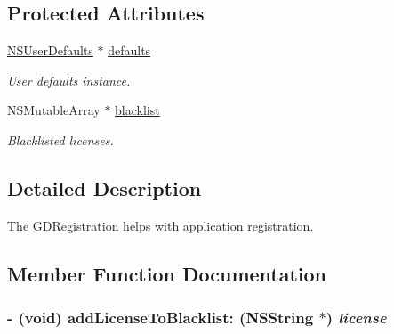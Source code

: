 \subsection*{Protected Attributes}
\begin{DoxyCompactItemize}
\item 
\hypertarget{interface_g_d_registration_a951a74df6032c61bdc6215df98dfc10f}{
\hyperlink{class_n_s_user_defaults}{NSUserDefaults} $\ast$ \hyperlink{interface_g_d_registration_a951a74df6032c61bdc6215df98dfc10f}{defaults}}
\label{interface_g_d_registration_a951a74df6032c61bdc6215df98dfc10f}

\begin{DoxyCompactList}\small\item\em User defaults instance. \item\end{DoxyCompactList}\item 
\hypertarget{interface_g_d_registration_a2cec9ccef516bf4ecbf55de00bf0dbda}{
NSMutableArray $\ast$ \hyperlink{interface_g_d_registration_a2cec9ccef516bf4ecbf55de00bf0dbda}{blacklist}}
\label{interface_g_d_registration_a2cec9ccef516bf4ecbf55de00bf0dbda}

\begin{DoxyCompactList}\small\item\em Blacklisted licenses. \item\end{DoxyCompactList}\end{DoxyCompactItemize}


\subsection{Detailed Description}
The \hyperlink{interface_g_d_registration}{GDRegistration} helps with application registration. 

\subsection{Member Function Documentation}
\hypertarget{interface_g_d_registration_a7b212d406ecc9f8dc9dc19714baac7f8}{
\subsubsection[{addLicenseToBlacklist:}]{\setlength{\rightskip}{0pt plus 5cm}-\/ (void) addLicenseToBlacklist: (NSString $\ast$) {\em license}}}
\label{interface_g_d_registration_a7b212d406ecc9f8dc9dc19714baac7f8}


